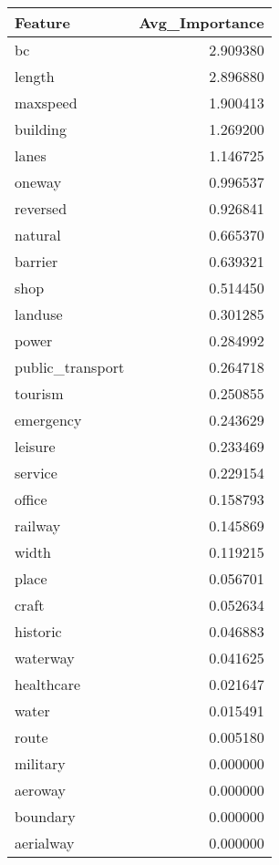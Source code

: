 \begin{tabular}{lr}
\toprule
Feature & Avg_Importance \\
\midrule
bc & 2.909380 \\
length & 2.896880 \\
maxspeed & 1.900413 \\
building & 1.269200 \\
lanes & 1.146725 \\
oneway & 0.996537 \\
reversed & 0.926841 \\
natural & 0.665370 \\
barrier & 0.639321 \\
shop & 0.514450 \\
landuse & 0.301285 \\
power & 0.284992 \\
public_transport & 0.264718 \\
tourism & 0.250855 \\
emergency & 0.243629 \\
leisure & 0.233469 \\
service & 0.229154 \\
office & 0.158793 \\
railway & 0.145869 \\
width & 0.119215 \\
place & 0.056701 \\
craft & 0.052634 \\
historic & 0.046883 \\
waterway & 0.041625 \\
healthcare & 0.021647 \\
water & 0.015491 \\
route & 0.005180 \\
military & 0.000000 \\
aeroway & 0.000000 \\
boundary & 0.000000 \\
aerialway & 0.000000 \\
\bottomrule
\end{tabular}
